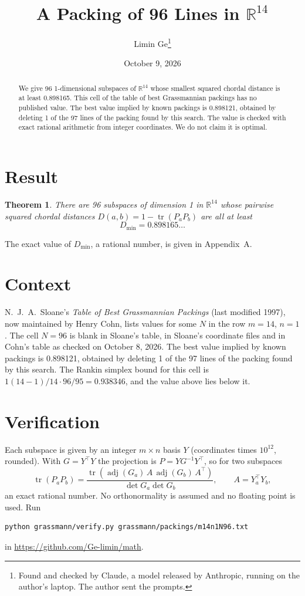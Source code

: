 \documentclass[11pt,a4paper]{article}
\title{A Packing of 96 Lines in $\mathbb{R}^{14}$}
\author{Limin Ge\thanks{Found and checked by Claude, a model released by Anthropic, running on the author's laptop. The author sent the prompts.}}
\date{October 9, 2026}
\newtheorem*{theorem}{Theorem}
\begin{document}
\maketitle
\begin{abstract}
We give 96 1-dimensional subspaces of $\mathbb{R}^{14}$ whose smallest squared chordal distance is at least 0.898165. This cell of the table of best Grassmannian packings has no published value. The best value implied by known packings is 0.898121, obtained by deleting 1 of the 97 lines of the packing found by this search. The value is checked with exact rational arithmetic from integer coordinates. We do not claim it is optimal.
\end{abstract}

\section{Result}
\begin{theorem}
There are 96 subspaces of dimension 1 in $\mathbb{R}^{14}$ whose pairwise squared chordal distances $D(a,b) = 1 - \operatorname{tr}(P_aP_b)$ are all at least
\[ D_{\min} = 0.898165\ldots \]
\end{theorem}
The exact value of $D_{\min}$, a rational number, is given in Appendix~A.


\section{Context}
N.~J.~A.~Sloane's \emph{Table of Best Grassmannian Packings} (last modified 1997), now maintained by Henry Cohn, lists values for some $N$ in the row $m=14$, $n=1$. The cell $N=96$ is blank in Sloane's table, in Sloane's coordinate files and in Cohn's table as checked on October 8, 2026. The best value implied by known packings is 0.898121, obtained by deleting 1 of the 97 lines of the packing found by this search. The Rankin simplex bound for this cell is $1(14-1)/14\cdot 96/95 = 0.938346$, and the value above lies below it.


\section{Verification}
Each subspace is given by an integer $m\times n$ basis $Y$ (coordinates times $10^{12}$, rounded). With $G=Y^\top Y$ the projection is $P=YG^{-1}Y^\top$, so for two subspaces
\[ \operatorname{tr}(P_aP_b)=\frac{\operatorname{tr}(\operatorname{adj}(G_a)\,A\,\operatorname{adj}(G_b)\,A^\top)}{\det G_a\det G_b},\qquad A=Y_a^\top Y_b, \]
an exact rational number. No orthonormality is assumed and no floating point is used. Run
\begin{verbatim}
python grassmann/verify.py grassmann/packings/m14n1N96.txt
\end{verbatim}
in \url{https://github.com/Ge-limin/math}.
\end{document}
